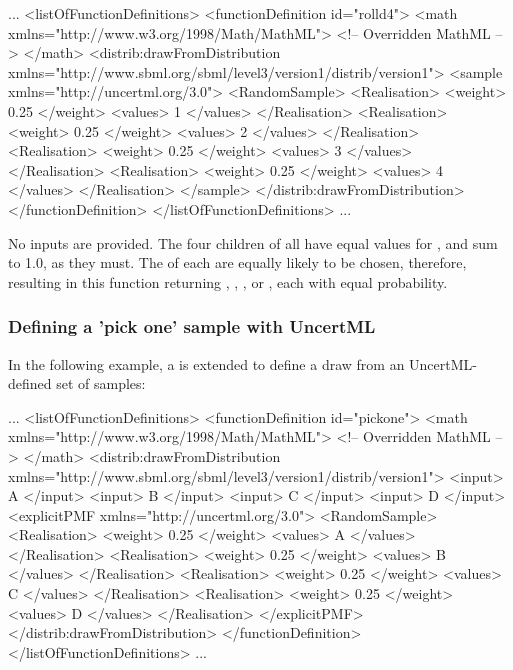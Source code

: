 \documentclass[draftspec]{sbmlpkgspec}
\begin{document}
\begin{example}
...
  <listOfFunctionDefinitions>
    <functionDefinition id="rolld4">
      <math xmlns="http://www.w3.org/1998/Math/MathML">
        <!-- Overridden MathML -->
      </math>
      <distrib:drawFromDistribution
               xmlns="http://www.sbml.org/sbml/level3/version1/distrib/version1">
         <sample xmlns="http://uncertml.org/3.0">
           <RandomSample>
             <Realisation>
               <weight> 0.25 </weight>
               <values> 1 </values>
             </Realisation>
             <Realisation>
               <weight> 0.25 </weight>
               <values> 2 </values>
             </Realisation>
             <Realisation>
               <weight> 0.25 </weight>
               <values> 3 </values>
             </Realisation>
             <Realisation>
               <weight> 0.25 </weight>
               <values> 4 </values>
             </Realisation>
         </sample>
      </distrib:drawFromDistribution>
    </functionDefinition>
  </listOfFunctionDefinitions>
...
\end{example}

No inputs are provided.  The four  children of  all have equal values for , and sum to 1.0, as they must.  The  of each are equally likely to be chosen, therefore, resulting in this function returning , , , or , each with equal probability.



\subsubsection{Defining a 'pick one' sample with UncertML}
In the following example, a \FunctionDefinition is extended to define a draw from an UncertML-defined set of samples:

\begin{example}
...
  <listOfFunctionDefinitions>
    <functionDefinition id="pickone">
      <math xmlns="http://www.w3.org/1998/Math/MathML">
        <!-- Overridden MathML -->
      </math>
      <distrib:drawFromDistribution
               xmlns="http://www.sbml.org/sbml/level3/version1/distrib/version1">
         <input> A </input>
         <input> B </input>
         <input> C </input>
         <input> D </input>
         <explicitPMF xmlns="http://uncertml.org/3.0">
           <RandomSample>
             <Realisation>
               <weight> 0.25 </weight>
               <values> A </values>
             </Realisation>
             <Realisation>
               <weight> 0.25 </weight>
               <values> B </values>
             </Realisation>
             <Realisation>
               <weight> 0.25 </weight>
               <values> C </values>
             </Realisation>
             <Realisation>
               <weight> 0.25 </weight>
               <values> D </values>
             </Realisation>
         </explicitPMF>
      </distrib:drawFromDistribution>
    </functionDefinition>
  </listOfFunctionDefinitions>
...
\end{example}
\end{document}
